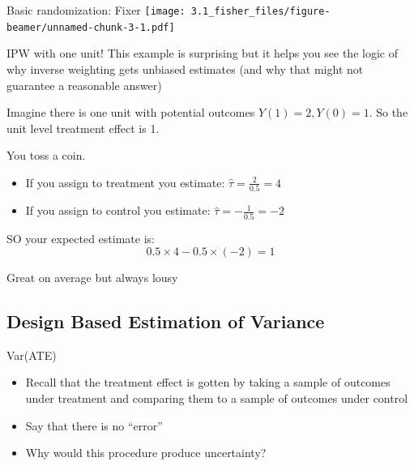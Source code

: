 \documentclass[
  11pt,
  ignorenonframetext,
]{beamer}
\providecommand{\tightlist}{%
  \setlength{\itemsep}{0pt}\setlength{\parskip}{0pt}}\usepackage{longtable,booktabs,array}
\begin{document}
\begin{frame}{Basic randomization: Fixer}
\protect\hypertarget{basic-randomization-fixer-1}{}
\texttt{[image: 3.1\_fisher\_files/figure-beamer/unnamed-chunk-3-1.pdf]}
\end{frame}

\begin{frame}{IPW with one unit!}
\protect\hypertarget{ipw-with-one-unit}{}
This example is surprising but it helps you see the logic of why inverse
weighting gets unbiased estimates (and why that might not guarantee a
reasonable answer)

Imagine there is one unit with potential outcomes
\(Y(1) = 2, Y(0) = 1\). So the unit level treatment effect is 1.

You toss a coin.

\begin{itemize}
\tightlist
\item
  If you assign to treatment you estimate:
  \(\hat\tau = \frac{2}{0.5} = 4\)
\item
  If you assign to control you estimate:
  \(\hat\tau = -\frac{1}{0.5} = -2\)
\end{itemize}

SO your expected estimate is: \[0.5 \times 4 - 0.5 \times (-2) = 1\]

Great on average but always lousy
\end{frame}

\hypertarget{design-based-estimation-of-variance}{%
\subsection{Design Based Estimation of
Variance}\label{design-based-estimation-of-variance}}

\begin{frame}{Var(ATE)}
\protect\hypertarget{varate}{}
\begin{itemize}
\tightlist
\item
  Recall that the treatment effect is gotten by taking a sample of
  outcomes under treatment and comparing them to a sample of outcomes
  under control
\item
  Say that there is no ``error''
\item
  Why would this procedure produce uncertainty?
\end{itemize}
\end{frame}
\end{document}
